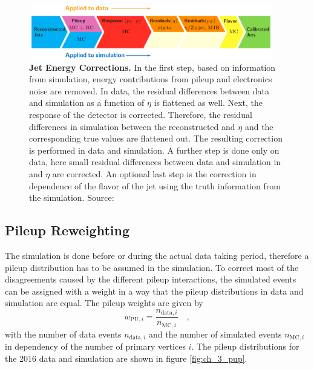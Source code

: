 \begin{figure}
\centering
\includegraphics[width=0.95\textwidth]{assets/JEC_levels.png}
\caption[Jet Energy Corrections]{\textbf{Jet Energy Corrections.} In the first step, based on information from simulation, energy contributions from pileup and electronics noise are removed. In data, the residual differences between data and simulation as a function of $\eta$ is flattened as well. Next, the response of the detector is corrected. Therefore, the residual differences in simulation between the reconstructed \pt and $\eta$ and the corresponding true values are flattened out. The resulting correction is performed in data and simulation. A further step is done only on data, here small residual differences between data and simulation in \pt and $\eta$ are corrected. An optional last step is the correction in dependence of the flavor of the jet using the truth information from the simulation. Source: \cite{JEC_levels}}
\label{fig:ch_3_JEC}
\end{figure}

\subsection{Pileup Reweighting}
The simulation is done before or during the actual data taking period, therefore a pileup distribution has to be assumed in the simulation. To correct most of the disagreements caused by the different pileup interactions, the simulated events can be assigned with a weight in a way that the pileup distributions in data and simulation are equal. The pileup weights are given by 
\begin{equation}
w_{\textrm{PU},i} = \frac{n_{\textrm{data},i}}{n_{\textrm{MC},i}} \quad ,
\end{equation}
with the number of data events $n_{\textrm{data},i}$ and the number of simulated events $n_{\textrm{MC},i}$ in dependency of the number of primary vertices $i$. The pileup distributions for the 2016 data and simulation are shown in figure \ref{fig:ch_3_pup}. 

